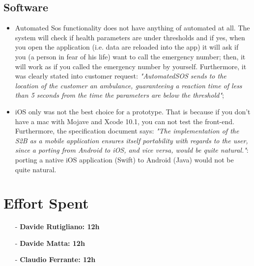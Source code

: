 \documentclass[a4paper]{article}
\begin{document}
\subsection{Software}
\begin{itemize}
    \item Automated Sos functionality does not have anything of automated at all. The system will check if health parameters are under thresholds and if yes, when you open the application (i.e. data are reloaded into the app) it will ask if you (a person in fear of his life) want to call the emergency number; then, it will work as if you called the emergency number by yourself. Furthermore, it was clearly stated into customer request: \textit{"AutomatedSOS sends to the location of the customer an ambulance, guaranteeing a reaction time of less than 5 seconds from the time the parameters are below the threshold"};
    
    \item iOS only was not the best choice for a prototype. That is because if you don't have a mac with Mojave and Xcode 10.1, you can not test the front-end. Furthermore, the specification document says: \textit{"The implementation of the S2B as a mobile application ensures itself portability with regards to the user, since a porting from Android to iOS, and vice versa, would be quite natural."}: porting a native iOS application (Swift) to Android (Java) would not be quite natural.
\end{itemize}

\newpage
\section{Effort Spent}
    \begin{itemize}
        \item[-] \textbf{Davide Rutigliano: 12h}
        
        \item[-] \textbf{Davide Matta: 12h}
        
        \item[-] \textbf{Claudio Ferrante: 12h}
    \end{itemize}
\end{document}
